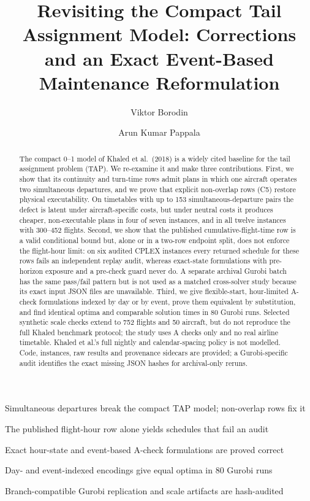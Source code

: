\documentclass[review, 12pt, authoryear]{elsarticle}
\theoremstyle{plain}
\theoremstyle{definition}
\theoremstyle{remark}
\begin{document}
\begin{frontmatter}

\title{Revisiting the Compact Tail Assignment Model: Corrections and an
  Exact Event-Based Maintenance Reformulation}

\author[kyiv]{Viktor Borodin}
\author[sutd]{Arun Kumar Pappala}

\address[kyiv]{Taras Shevchenko National University, Kyiv, Ukraine}
\address[sutd]{Singapore University of Technology and Design, Singapore}

\begin{highlights}
\item Simultaneous departures break the compact TAP model; non-overlap rows fix it
\item The published flight-hour row alone yields schedules that fail an audit
\item Exact hour-state and event-based A-check formulations are proved correct
\item Day- and event-indexed encodings give equal optima in 80 Gurobi runs
\item Branch-compatible Gurobi replication and scale artifacts are hash-audited
\end{highlights}

\begin{abstract}
The compact 0--1 model of Khaled et al.\ (2018) is a widely cited baseline for
the tail assignment problem (TAP). We re-examine it and make three
contributions. First, we show that its continuity and turn-time rows admit
plans in which one aircraft operates two simultaneous departures, and we prove
that explicit non-overlap rows (C5) restore physical executability. On
timetables with up to 153 simultaneous-departure pairs the defect is latent
under aircraft-specific costs, but under neutral costs it produces cheaper,
non-executable plans in four of seven instances, and in all twelve instances
with 300--452 flights. Second, we show that the
published cumulative-flight-time row is a valid conditional bound but, alone or
in a two-row endpoint split, does not enforce the flight-hour limit: on six
audited CPLEX instances every returned schedule for these rows fails an
independent replay audit, whereas exact-state formulations with pre-horizon
exposure and a pre-check guard never do. A separate archival Gurobi batch has
the same pass/fail pattern but is not used as a matched cross-solver study
because its exact input JSON files are unavailable. Third, we give
flexible-start, hour-limited A-check formulations indexed by day or by event,
prove them equivalent by substitution, and find identical optima and
comparable solution times in 80 Gurobi runs. Selected synthetic scale checks
extend to 752 flights and 50 aircraft, but do not reproduce the full Khaled
benchmark protocol; the study uses A checks only and no real airline timetable.
Khaled et al.'s full nightly and calendar-spacing policy is not modelled. Code,
instances, raw results and provenance sidecars are provided; a Gurobi-specific
audit identifies the exact missing JSON hashes for archival-only reruns.
\end{abstract}


\end{frontmatter}
\end{document}
